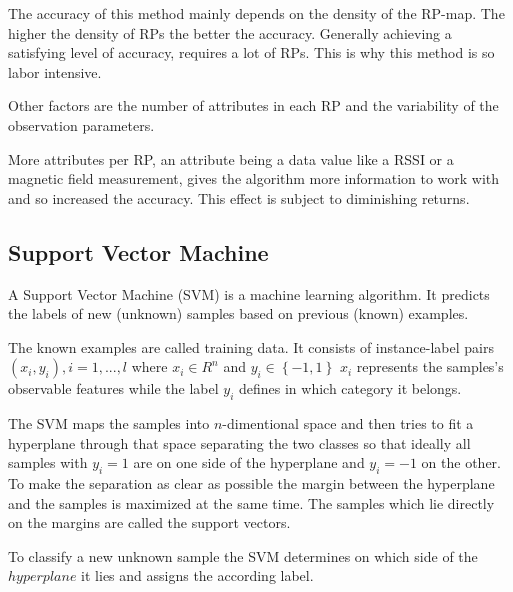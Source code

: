 The accuracy of this method mainly depends on the density of the RP-map. The higher the density of RPs the better the accuracy. Generally achieving a satisfying level of accuracy, requires a lot of RPs. This is why this method is so labor intensive.

Other factors are the number of attributes in each RP and the variability of the observation parameters.

More attributes per RP, an attribute being a data value like a RSSI or a magnetic field measurement, gives the algorithm more information to work with and so increased the accuracy\cite{Li2012feasableMagnetic}. This effect is subject to diminishing returns\cite{brouwers2014incremental}.



\subsection{Support Vector Machine}
A Support Vector Machine (SVM) is a machine learning algorithm. It predicts the labels of new (unknown) samples based on previous (known) examples. 

The known examples are called training data. It consists of instance-label pairs \(\left ( x_{i}, y_{i} \right ), i=1,...,l\) where \(x_{i}\in R^{n}\) and \(y_{i}\in \left \{ -1,1 \right \}\)
\(x_{i}\) represents the samples's observable features while the label \(y_{i}\) defines in which category it belongs.

The SVM maps the samples into \(n\)-dimentional space and then tries to fit a hyperplane through that space separating the two classes so that ideally all samples with \(y_{i}=1\) are on one side of the hyperplane and \(y_{i}=-1\) on the other. To make the separation as clear as possible the margin between the hyperplane and the samples is maximized at the same time. The samples which lie directly on the margins are called the support vectors.

To classify a new unknown sample the SVM determines on which side of the \(hyperplane\) it lies and assigns the according label.



